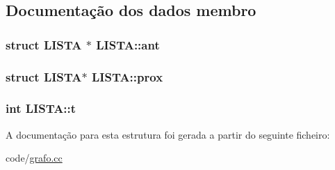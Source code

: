 \subsection{Documentação dos dados membro}
\hypertarget{structLISTA_acbab5a56fa16181657e3036ffa9fca11}{
\subsubsection[{ant}]{\setlength{\rightskip}{0pt plus 5cm}struct {\bf L\-I\-S\-T\-A} $\ast$ L\-I\-S\-T\-A\-::ant}}\label{structLISTA_acbab5a56fa16181657e3036ffa9fca11}
\hypertarget{structLISTA_a818a9fbd5f34b29597c140c052309ea6}{
\subsubsection[{prox}]{\setlength{\rightskip}{0pt plus 5cm}struct {\bf L\-I\-S\-T\-A}$\ast$ L\-I\-S\-T\-A\-::prox}}\label{structLISTA_a818a9fbd5f34b29597c140c052309ea6}
\hypertarget{structLISTA_a81b29c44560db14d9d5ef75858c91a0b}{
\subsubsection[{t}]{\setlength{\rightskip}{0pt plus 5cm}int L\-I\-S\-T\-A\-::t}}\label{structLISTA_a81b29c44560db14d9d5ef75858c91a0b}


A documentação para esta estrutura foi gerada a partir do seguinte ficheiro\-:\begin{DoxyCompactItemize}
\item 
code/\hyperlink{grafo_8cc}{grafo.\-cc}\end{DoxyCompactItemize}
